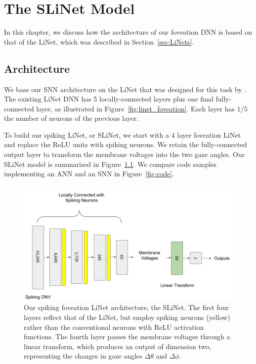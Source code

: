 \documentclass [MS] {UCLAthesis}
\begin{document}


\chapter{The SLiNet Model}

In this chapter, we discuss how the architecture of our foveation DNN is based on that of the LiNet, which was described in Section~\ref{sec:LiNets}.

\section{Architecture}

We base our SNN architecture on the LiNet that was designed for this task by \citep{Masaki_linet}. The existing LiNet DNN has 5 locally-connected layers plus one final fully-connected layer, as illustrated in Figure~\ref{fig:linet_foveation}. Each layer has $1/5$ the number of neurons of the previous layer. 

To build our spiking LiNet, or SLiNet, we start with a 4 layer foveation LiNet and replace the ReLU units with spiking neurons. We retain the fully-connected output layer to transform the membrane voltages into the two gaze angles. Our SLiNet model is summarized in Figure~\ref{fig:linet_arch}. We compare code samples implementing an ANN and an SNN in Figure~\ref{fig:code}.

\begin{figure}
    \centering
    \includegraphics[width=\textwidth]{arch_spiking}
    \caption[SLiNet architecture]{Our spiking foveation LiNet architecture, the SLiNet. The first four layers reflect that of the LiNet, but employ spiking neurons (yellow) rather than the conventional neurons with ReLU activation functions. The fourth layer passes the membrane voltages through a linear transform, which produces an output of dimension two, representing the changes in gaze angles $\Delta\theta$ and $\Delta\phi$.}
    \label{fig:linet_arch}
\end{figure}
\end{document}
